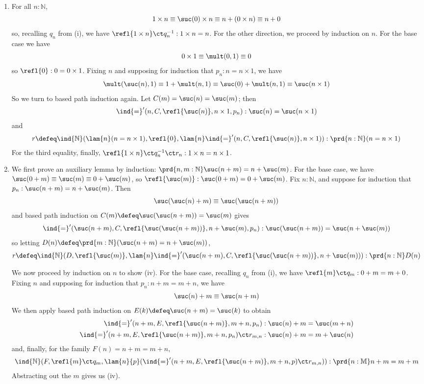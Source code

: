\begin{enumerate}
\item For all $n : \mathbb{N}$,
\[
1 \times n \equiv \suc(0) \times n 
\equiv n + (0 \times n) \equiv n + 0
\]
so, recalling $q_{n}$ from (i), we have $\refl{1 \times n} \ct q^{-1}_{n} : 1
\times n = n$.  For the other direction, we proceed by induction on $n$.  For
the base case we have
\[
0 \times 1 \equiv \mult(0, 1) \equiv 0
\]
so $\refl{0} : 0 = 0 \times 1$.  Fixing $n$ and supposing for induction that $p_{n} : n = n
\times 1$, we have
\[
\mult(\suc(n), 1) 
\equiv 1 + \mult(n, 1) 
\equiv \suc(0) + \mult(n, 1)
\equiv \suc(n \times 1)
\]
So we turn to based path induction again.  Let $C(m) = \suc(n) = \suc(m)$; then
    \[
    \ind{=}'(n, C, \refl{\suc(n)}, n \times 1, p_{n})
    : \suc(n) = \suc(n \times 1)
    \]
    and
    \[
    r \defeq \ind{\mathbb{N}}(\lam{n}(n = n \times 1), \refl{0}, 
    \lam{n}\ind{=}'(n, C, \refl{\suc(n)}, n \times 1))
    : \prd{n:\mathbb{N}}(n = n \times 1)
    \]
    For the third equality, finally, $\refl{1 \times n} \ct q_{n}^{-1} \ct r_{n} : 1
    \times n = n \times 1$.

\item We first prove an auxiliary lemma by induction: $\prd{n,
m:\mathbb{N}} \suc(n+m) = n + \suc(m)$.  For the base case, we have $\suc(0+m)
\equiv \suc(m) \equiv 0 + \suc(m)$, so $\refl{\suc(m)} : \suc(0+m) = 0 +
\suc(m)$.  Fix $n : \mathbb{N}$, and suppose for induction that $p_{n} : \suc(n
+ m) = n + \suc(m)$.  Then
\[
\suc(\suc(n) + m) \equiv \suc(\suc(n+m))
\]
and based path induction on $C(m) \defeq \suc(\suc(n + m)) = \suc(m)$ gives
\[
\ind{=}'(\suc(n+m), C, \refl{\suc(\suc(n+m))}, n + \suc(m), p_{n})
: \suc(\suc(n+m)) = \suc(n + \suc(m))
\]
so letting $D(n) \defeq \prd{m : \mathbb{N}}(\suc(n+m) = n + \suc(m))$,
\[
r \defeq \ind{\mathbb{N}}(D, \refl{\suc(m)}, 
\lam{n}\ind{=}'(\suc(n+m), C, \refl{\suc(\suc(n+m))}, n + \suc(m))
)
: \prd{n:\mathbb{N}} D(n)
\]

We now proceed by induction on $n$ to show (iv).  For the base case, recalling
$q_{n}$ from (i), we have $\refl{m} \ct q_{m} : 0 + m = m + 0$.  Fixing $n$ and
supposing for induction that $p_{n} : n + m = m + n$, we have
\[
\suc(n) + m \equiv \suc(n + m)
\]
We then apply based path induction on $E(k) \defeq \suc(n+m) = \suc(k)$ to
obtain
\begin{align*}
\ind{=}'(n+m, E, \refl{\suc(n+m)}, m+n, p_{n}) &: \suc(n)+m = \suc(m+n) \\
\ind{=}'(n+m, E, \refl{\suc(n+m)}, m+n, p_{n}) \ct r_{m,n} &: \suc(n)+m = m +
\suc(n)
\end{align*}
and, finally, for the family $F(n) = n+m = m + n$,
\[
\ind{\mathbb{N}}(F, \refl{m} \ct q_{m}, 
\lam{n}{p}(
\ind{=}'(n+m, E, \refl{\suc(n+m)}, m+n, p) \ct r_{m,n}
)
) : \prd{n:\mathbb{M}}n+m = m+m
\]
Abstracting out the $m$ gives us (iv).


\end{enumerate}
